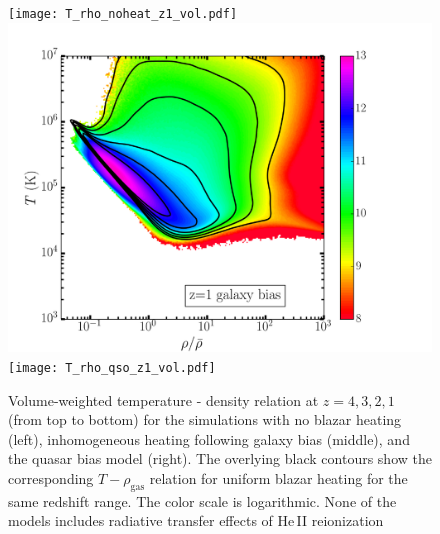 \documentclass[numberedappendix]{emulateapj}
\begin{document}
\begin{figure}
\texttt{[image: T\_rho\_noheat\_z1\_vol.pdf]}
\includegraphics[trim=.5cm 0cm 3cm .5cm, clip ,width = .32\textwidth ]{T_rho_gal_z1_vol.pdf}
\texttt{[image: T\_rho\_qso\_z1\_vol.pdf]}
\caption{ Volume-weighted temperature - density relation at $z=4,3,2,1$ (from top to bottom) for the simulations with no blazar heating (left), inhomogeneous heating following galaxy bias (middle), and the quasar bias model (right). The overlying black contours show the corresponding $T-\rho_{\mathrm{gas}}$ relation for uniform blazar heating \citep{2012MNRAS.423..149P} for the same redshift range. The color scale is logarithmic. None of the models includes radiative transfer effects of He\,\textsc{II} reionization}
\label{fig:T_rho}
\end{figure}
\end{document}
